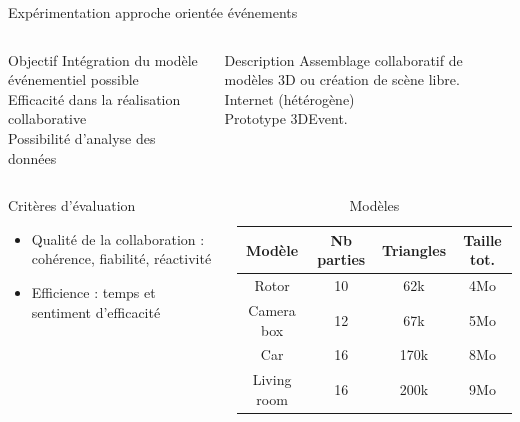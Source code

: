 \begin{frame}{Expérimentation approche orientée événements}
		\begin{columns}[onlytextwidth]
		\begin{alertblock}{Objectif}
			Intégration du modèle événementiel possible\\
			Efficacité dans la réalisation collaborative\\
			Possibilité d'analyse des données
		\end{alertblock}
		
		\begin{block}{Description}
			Assemblage collaboratif de modèles 3D ou création de scène libre.\\
			Internet (hétérogène) \\
			Prototype 3DEvent.\\
		\end{block}
	\end{columns}

	\begin{columns}[onlytextwidth]
			\begin{block}{Critères d'évaluation}
				\begin{itemize}
					\item Qualité de la collaboration : cohérence, fiabilité, réactivité
					\item Efficience : temps et sentiment d'efficacité
				\end{itemize}
			\end{block}
			\scriptsize
			\begin{table}[ht]
			\centering
			\caption{Modèles}
			\begin{tabular}{cccc}
				\textbf{Modèle}  & \textbf{Nb parties} &  \textbf{Triangles} & 
				\textbf{Taille 
				tot.}  \\ \hline
				Rotor      &   10  &    62k & 4Mo \\
				Camera box        &   12  &    67k & 5Mo        \\
				Car      &   16  &      170k & 8Mo \\ 
				Living room      &   16  &      200k & 9Mo \\\hline
			\end{tabular}
		\end{table}
	\end{columns}
\end{frame}

